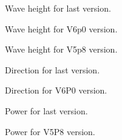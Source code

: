 \begin{figure} [!h]
\centering
{}
 \caption{Wave height for last version.}
\label{figcalaishm0}
\end{figure}
\begin{figure} [!h]
\centering
{}
 \caption{Wave height for V6p0 version.}
\label{figcalaishm0v6p0}
\end{figure}
\begin{figure} [!h]
\centering
{}
 \caption{Wave height for V5p8 version.}
\label{figcalaishm0v5p8}
\end{figure}
\begin{figure} [!h]
\centering
{}
 \caption{Direction for last version.}
\label{figcalaisdirection}
\end{figure}
\begin{figure} [!h]
\centering
{}
 \caption{Direction for V6P0  version.}
\label{figcalaisdirectionV6P0}
\end{figure}
\begin{figure} [!h]
\centering
{}
 \caption{Power for last version.}
\label{figcalaispower}
\end{figure}
\begin{figure} [!h]
\centering
{}
 \caption{Power for V5P8 version.}
\label{figcalaispowerv5P8}
\end{figure}
